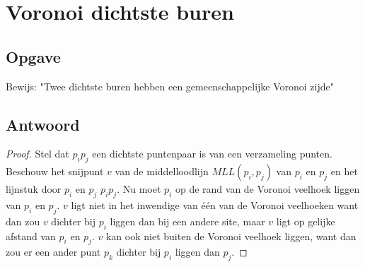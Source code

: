 \documentclass[examenvragen.tex]{subfiles}
\begin{document}
\section{Voronoi dichtste buren}
\subsection{Opgave}
Bewijs: "Twee dichtste buren hebben een gemeenschappelijke Voronoi zijde"

\subsection{Antwoord}
\begin{proof}
Stel dat $p_ip_j$ een dichtste puntenpaar is van een verzameling punten. Beschouw het snijpunt $v$ van de middelloodlijn $MLL(p_i,p_j)$ van $p_i$ en $p_j$ en het lijnstuk door $p_i$ en $p_j$ $p_ip_j$. Nu moet $p_i$ op de rand van de Voronoi veelhoek liggen van $p_i$ en $p_j$. $v$ ligt niet in het inwendige van \'e\'en van de Voronoi veelhoeken want dan zou $v$ dichter bij $p_i$ liggen dan bij een andere site, maar $v$ ligt op gelijke afstand van $p_i$ en $p_j$. $v$ kan ook niet buiten de Voronoi veelhoek liggen, want dan zou er een ander punt $p_k$ dichter bij $p_i$ liggen dan $p_j$.
\end{proof}
\end{document}
